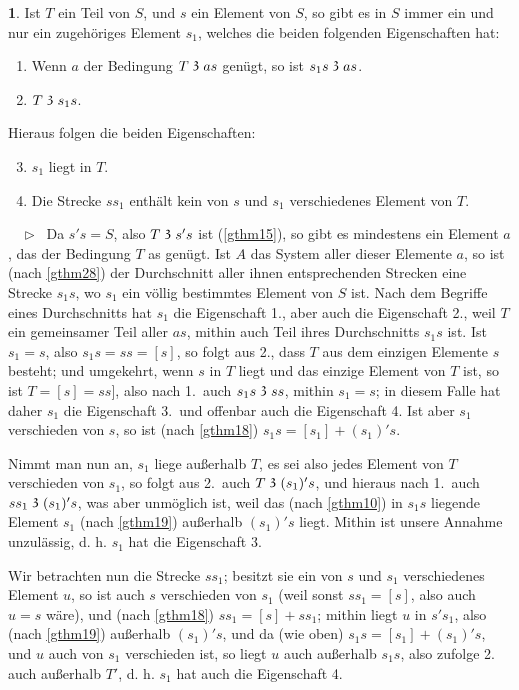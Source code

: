 \documentclass[leqno,hidelinks]{article}
\theoremstyle{definition}
\newtheorem{satz}{\protect\satzname}
\newcommand{\satzname}{}
\renewcommand{\satzname}{\hspace{-4pt}.\ Satz}%
\renewcommand{\satzname}{\hspace{-4pt}.\ Theorem}%
\newcommand\beweis{ $ \phantom{'.'} \rhd \ $}%
\newcommand\TeilVon{\mathrel{\raisebox{0.45ex}{$\mathfrak{3}$}}}
\newcommand{\sref}[1]{\underline{\ref{#1}}}%
\begin{document}
\begin{paracol}{2}
\begin{satz}\label{gthm29}
Ist $T$ ein Teil von $S$, und $s$ ein Element von $S$, so gibt es in $S$ immer ein
und nur ein zugehöriges Element $s_1$, welches die beiden folgenden Eigenschaften hat:
\begin{enumerate} \setcounter{enumi}{0} \setlength\itemsep{-0.25em}
   \item  Wenn $a$ der Bedingung $T \TeilVon as$ genügt, so ist $s_1s \TeilVon as$.
   \item $T \TeilVon s_1s$.
\end{enumerate}
Hieraus folgen die beiden Eigenschaften:
\begin{enumerate} \setcounter{enumi}{2} \setlength\itemsep{-0.25em}
    \item $s_1$ liegt in $T$.
    \item Die Strecke $ss_1$ enthält kein von $s$ und $s_1$ verschiedenes Element von $T$.
\end{enumerate}
\beweis
Da $s's = S$, also $T \TeilVon s's$ ist (\sref{gthm15}), so gibt es mindestens
ein Element $a$, das der Bedingung $T$ as genügt. Ist $A$ das System aller dieser
Elemente $a$, so ist (nach \sref{gthm28}) der Durchschnitt aller ihnen entsprechenden
Strecken eine Strecke $s_1s$, wo $s_1$ ein völlig bestimmtes Element von $S$ ist.
Nach dem Begriffe eines Durchschnitts hat $s_1$ die Eigenschaft 1., aber auch die
Eigenschaft 2., weil $T$ ein gemeinsamer Teil aller $as$, mithin auch Teil ihres
Durchschnitts $s_1s$ ist. Ist $s_1 = s$, also $s_1s = ss = [s]$, so folgt aus 2.,
dass $T$ aus dem einzigen Elemente $s$ besteht; und umgekehrt, wenn $s$ in $T$
liegt und das einzige Element von $T$ ist, so ist $T = [s] = ss]$, also nach 1.\
auch $s_1s \TeilVon ss$, mithin $s_1 = s$; in diesem Falle hat daher $s_1$ die
Eigenschaft 3.\ und offenbar auch die Eigenschaft 4. Ist aber $s_1$ verschieden
von $s$, so ist (nach \sref{gthm18}) $s_1s = [s_1] + (s_1)'s$.

Nimmt man nun an, $s_1$ liege außerhalb $T$, es sei also jedes Element von $T$
verschieden von $s_1$, so folgt aus 2.\ auch $T \TeilVon (s_1)'s$, und hieraus
nach 1.\ auch $ss_1 \TeilVon (s_1)'s$, was aber unmöglich ist, weil das (nach
\sref{gthm10}) in $s_1s$ liegende Element $s_1$ (nach \sref{gthm19}) außerhalb
$(s_1)'s$ liegt. Mithin ist unsere Annahme unzulässig, d. h.  $s_1$  hat die
Eigenschaft 3.

Wir betrachten nun die Strecke $ss_1$; besitzt sie ein von $s$ und $s_1$
verschiedenes Element $u$, so ist auch $s$ verschieden von $s_1$ (weil sonst
$ss_1 = [s]$, also auch $u = s$ wäre), und (nach \sref{gthm18}) $ss_1 = [s] + ss_1$;
mithin liegt $u$ in $s's_1$, also (nach \sref{gthm19}) außerhalb $(s_1)'s$, und
da (wie oben) $s_1s = [s_1] + (s_1)'s$, und $u$ auch von $s_1$ verschieden ist, so
liegt $u$ auch außerhalb  $s_1s$, also zufolge 2. auch außerhalb $T'$, d. h. $s_1$
hat auch die Eigenschaft 4.
\end{satz}


\end{paracol}
\end{document}

